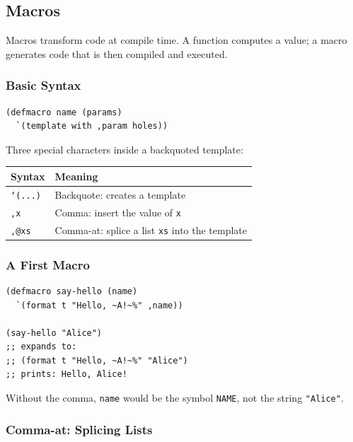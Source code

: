 \subsection{Macros}

Macros transform code at compile time. A function computes a value;
a macro generates code that is then compiled and executed.

\subsubsection{Basic Syntax}

\begin{lstlisting}
(defmacro name (params)
  `(template with ,param holes))
\end{lstlisting}

Three special characters inside a backquoted template:

\begin{center}
\begin{tabular}{lp{7cm}}
  \toprule
  \textbf{Syntax} & \textbf{Meaning} \\
  \midrule
  \texttt{`(...)}   & Backquote: creates a template \\
  \texttt{,x}       & Comma: insert the value of \texttt{x} \\
  \texttt{,@xs}     & Comma-at: splice a list \texttt{xs} into the template \\
  \bottomrule
\end{tabular}
\end{center}

\subsubsection{A First Macro}

\begin{lstlisting}
(defmacro say-hello (name)
  `(format t "Hello, ~A!~%" ,name))

(say-hello "Alice")
;; expands to:
;; (format t "Hello, ~A!~%" "Alice")
;; prints: Hello, Alice!
\end{lstlisting}

Without the comma, \texttt{name} would be the symbol \texttt{NAME},
not the string \texttt{"Alice"}.

\subsubsection{Comma-at: Splicing Lists}

